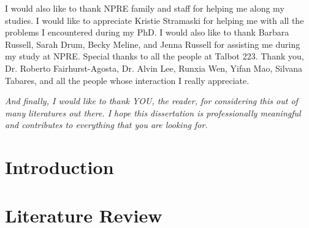 \documentclass{uiucthesis2021}
\begin{document}
\begin{acknowledgments}
I would also like to thank NPRE family and staff for helping me along my studies. I would like to appreciate Kristie Stramaski for helping me with all the problems I encountered during my PhD. I would also like to thank Barbara Russell, Sarah Drum, Becky Meline, and Jenna Russell for assisting me during my study at NPRE. Special thanks to all the people at Talbot 223. Thank you, Dr. Roberto Fairhurst-Agosta, Dr. Alvin Lee, Runxia Wen, Yifan Mao, Silvana Tabares, and all the people whose interaction I really appreciate.

\textit{And finally, I would like to thank YOU, the reader, for considering this out of many literatures out there. I hope this dissertation is professionally meaningful and contributes to everything that you are looking for.}

\end{acknowledgments}

{
    \hypersetup{linkcolor=black}  %
    \tableofcontents
}

%
%
%

\mainmatter

\chapter{Introduction}


\chapter{Literature Review}

\end{document}
